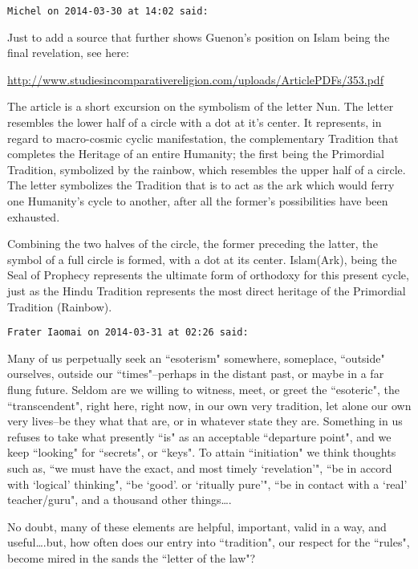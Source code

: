 \begin{footnotesize}
\begin{sffamily}
\hfill

\texttt{Michel on 2014-03-30 at 14:02 said: }

Just to add a source that further shows Guenon's position on Islam being the final revelation, see here:

\url{http://www.studiesincomparativereligion.com/uploads/ArticlePDFs/353.pdf}

The article is a short excursion on the symbolism of the letter Nun. The letter resembles the lower half of a circle with a dot at it's center. It represents, in regard to macro-cosmic cyclic manifestation, the complementary Tradition that completes the Heritage of an entire Humanity; the first being the Primordial Tradition, symbolized by the rainbow, which resembles the upper half of a circle. The letter symbolizes the Tradition that is to act as the ark which would ferry one Humanity's cycle to another, after all the former's possibilities have been exhausted.

Combining the two halves of the circle, the former preceding the latter, the symbol of a full circle is formed, with a dot at its center. Islam(Ark), being the Seal of Prophecy represents the ultimate form of orthodoxy for this present cycle, just as the Hindu Tradition represents the most direct heritage of the Primordial Tradition (Rainbow).


\hfill

\texttt{Frater Iaomai on 2014-03-31 at 02:26 said: }

Many of us perpetually seek an ``esoterism" somewhere, someplace, ``outside" ourselves, outside our ``times"–perhaps in the distant past, or maybe in a far flung future. Seldom are we willing to witness, meet, or greet the ``esoteric", the ``transcendent", right here, right now, in our own very tradition, let alone our own very lives–be they what that are, or in whatever state they are. Something in us refuses to take what presently ``is" as an acceptable ``departure point", and we keep ``looking" for ``secrets", or ``keys". To attain ``initiation" we think thoughts such as, ``we must have the exact, and most timely `revelation'", ``be in accord with `logical' thinking", ``be `good'. or `ritually pure'", ``be in contact with a `real' teacher/guru", and a thousand other things….

No doubt, many of these elements are helpful, important, valid in a way, and useful….but, how often does our entry into ``tradition", our respect for the ``rules", become mired in the sands the ``letter of the law"? 


\end{sffamily}
\end{footnotesize}
